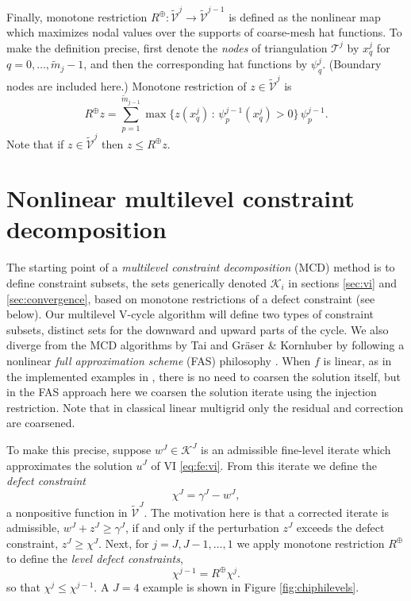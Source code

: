\documentclass[letterpaper,final,12pt,reqno]{amsart}
\theoremstyle{cstyle}
\theoremstyle{cstyle*}
\theoremstyle{dstyle}
\numberwithin{equation}{section}
\numberwithin{figure}{section}
\numberwithin{table}{section}
\numberwithin{theorem}{section}
\newcommand{\cK}{\mathcal{K}}
\newcommand{\mR}{R^{\bm{\oplus}}}
\begin{document}
Finally, monotone restriction $\mR:\tilde{\mathcal{V}}^j\to\tilde{\mathcal{V}}^{j-1}$ is defined as the nonlinear map which maximizes nodal values over the supports of coarse-mesh hat functions.  To make the definition precise, first denote the \emph{nodes} of triangulation $\mathcal{T}^j$ by $x_q^j$ for $q=0,\dots,\tilde{m}_j-1$, and then the corresponding hat functions \cite{Elmanetal2014} by $\psi_q^j$.  (Boundary nodes are included here.)  Monotone restriction of $z\in\tilde{\mathcal{V}}^j$ is
\begin{equation}
  \mR z = \sum_{p=1}^{\tilde m_{j-1}} \max \{z(x_q^j) \,:\, \psi_p^{j-1}(x_q^j) > 0\}\, \psi_p^{j-1}. \label{eq:fe:monotonerestriction}
\end{equation}
Note that if $z\in\tilde{\mathcal{V}}^j$ then $z \le \mR z$.


\section{Nonlinear multilevel constraint decomposition} \label{sec:multilevel}

The starting point of a \emph{multilevel constraint decomposition} (MCD) \cite{GraeserKornhuber2009,Tai2003} method is to define constraint subsets, the sets generically denoted $\cK_i$ in sections \ref{sec:vi} and \ref{sec:convergence}, based on monotone restrictions of a defect constraint (see below).  Our multilevel V-cycle algorithm will define two types of constraint subsets, distinct sets for the downward and upward parts of the cycle.  We also diverge from the MCD algorithms by Tai \cite{Tai2003} and Gr\"aser \& Kornhuber \cite[Algorithm 4.7]{GraeserKornhuber2009} by following a nonlinear \emph{full approximation scheme} (FAS) philosophy \cite{BrandtLivne2011}.  When $f$ is linear, as in the implemented examples in \cite{GraeserKornhuber2009,Tai2003}, there is no need to coarsen the solution itself, but in the FAS approach here we coarsen the solution iterate using the injection restriction.  Note that in classical linear multigrid only the residual and correction are coarsened.

To make this precise, suppose $w^J \in \cK^J$ is an admissible fine-level iterate which approximates the solution $u^J$ of VI \eqref{eq:fe:vi}.  From this iterate we define the \emph{defect constraint} \cite{GraeserKornhuber2009}
\begin{equation}
\chi^J = \gamma^J - w^J,  \label{eq:fe:defectconstraintfcn}
\end{equation}
a nonpositive function in $\tilde{\mathcal{V}}^J$.  The motivation here is that a corrected iterate is admissible, $w^J + z^J \ge \gamma^J$, if and only if the perturbation $z^J$ exceeds the defect constraint, $z^J \ge \chi^J$.  Next, for $j=J,J-1,\dots,1$ we apply monotone restriction $\mR$ to define the \emph{level defect constraints},
\begin{equation}
\chi^{j-1} = \mR \chi^j. \label{eq:fe:chilevels}
\end{equation}
so that $\chi^j \le \chi^{j-1}$.  A $J=4$ example is shown in Figure \ref{fig:chiphilevels}.
\end{document}
